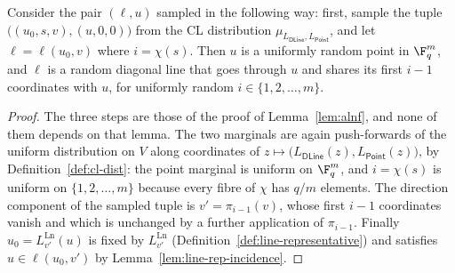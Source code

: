 \begin{lemma}\label{lem:dlnf}
	\leanok
	Consider the pair $(\ell, u)$ sampled in the following way: first, sample the tuple $\bigl((u_0,s,v),(u,0,0)\bigr)$ from the CL distribution $\mu_{L_{\mathsf{DLine}}, L_{\mathsf{Point}}}$, and let $\ell = \ell(u_0, v)$ where $i = \chi(s)$. Then $u$ is a uniformly random point in $\F_q^m$, and $\ell$ is a random diagonal line that goes through $u$ and shares its first $i-1$ coordinates with $u$, for uniformly random $i \in \{1,2,\ldots,m\}$.
\end{lemma}
\begin{proof}
	\leanok
	The three steps are those of the proof of Lemma~\ref{lem:alnf}, and none of them depends on that lemma. The two marginals are again push-forwards of the uniform distribution on $V$ along coordinates of $z \mapsto \bigl(L_{\mathsf{DLine}}(z), L_{\mathsf{Point}}(z)\bigr)$, by Definition~\ref{def:cl-dist}: the point marginal is uniform on $\F_q^m$, and $i = \chi(s)$ is uniform on $\{1,2,\ldots,m\}$ because every fibre of $\chi$ has $q/m$ elements. The direction component of the sampled tuple is $v' = \pi_{i-1}(v)$, whose first $i-1$ coordinates vanish and which is unchanged by a further application of $\pi_{i-1}$. Finally $u_0 = L^{\mathrm{Ln}}_{v'}(u)$ is fixed by $L^{\mathrm{Ln}}_{v'}$ (Definition~\ref{def:line-representative}) and satisfies $u \in \ell(u_0,v')$ by Lemma~\ref{lem:line-rep-incidence}.
\end{proof}

